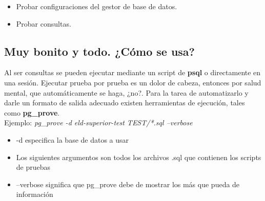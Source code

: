 \documentclass{article}
\begin{document}
\begin{itemize}
\begin{lstlisting}[
    backgroundcolor=\color{background},
    language=SQL,
    showspaces=false,
    basicstyle=\ttfamily,
    numbers=left,
    numberstyle=\tiny,
    commentstyle=\color{gray}
    ]
        SELECT has_column('public', 'tal01_alumno', 'tx_matricula', 
            'Probar que la tabla public.tal01_alumno tenga la columna tx_matricula');
        SELECT has_pk('public', 'tal01_alumno', 'Probar que la tabla public.tal01_alumno tenga pk');
        SELECT fk_ok(
            'public',
            'tal01_alumno',
            ARRAY['id_sexo'],
            'public',
            'tib14_sexo',
            ARRAY['id_sexo']
        );
        SELECT * FROM finish();
    ROLLBACK;
    \end{lstlisting}
    \item Probar configuraciones del gestor de base de datos.
    \item Probar consultas.
\end{itemize}
\subsection{Muy bonito y todo. ¿Cómo se usa?}
Al ser consultas se pueden ejecutar mediante un script de \textbf{psql} o directamente en una sesión. Ejecutar prueba por prueba es un dolor de cabeza, entonces por salud mental, que automáticamente se haga, ¿no?.
Para la tarea de automatizarlo y darle un formato de salida adecuado existen herramientas de ejecución, tales como \textbf{pg\_prove}.\\
Ejemplo:
\textit{pg\_prove -d eld-superior-test TEST/*.sql --verbose}\\
\begin{itemize}
    \item -d especifica la base de datos a usar
    \item Los siguientes argumentos son todos los archivos .sql que contienen los scripts de pruebas
    \item --verbose significa que pg\_prove debe de mostrar los más que pueda de información
\end{itemize}
\end{document}
